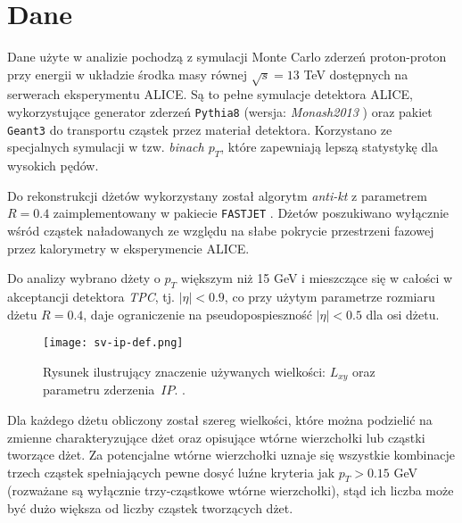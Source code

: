 \section{Dane}
\label{sec:dane}


Dane użyte w analizie pochodzą z symulacji Monte Carlo zderzeń proton-proton przy energii w układzie środka masy równej $\sqrt{s} = 13$ TeV dostępnych na serwerach eksperymentu ALICE.
Są to pełne symulacje detektora ALICE, wykorzystujące generator zderzeń \texttt{Pythia8} \cite{Sjostrand:2007gs} (wersja: \textit{Monash2013} \cite{Skands:2014pea}) oraz pakiet \texttt{Geant3} \cite{Brun:1994aa} do transportu cząstek przez materiał detektora. Korzystano ze specjalnych symulacji w tzw. \textit{binach $p_T$}, które zapewniają lepszą statystykę dla wysokich pędów.

Do rekonstrukcji dżetów wykorzystany został algorytm \textit{anti-kt} z parametrem $R = 0.4$ zaimplementowany w pakiecie \texttt{FASTJET} \cite{Cacciari:2011ma}. Dżetów poszukiwano wyłącznie wśród cząstek naładowanych  ze względu na słabe pokrycie przestrzeni fazowej przez kalorymetry w eksperymencie ALICE.

Do analizy wybrano dżety o $p_T$ większym niż 15 GeV i mieszczące się w całości w akceptancji detektora \textit{TPC}, tj. $|\eta| < 0.9$, co przy użytym parametrze rozmiaru dżetu $R = 0.4$, daje ograniczenie na pseudopospieszność $|\eta| < 0.5$ dla osi dżetu.

\begin{figure}[ht]
	\centering
	\texttt{[image: sv-ip-def.png]}
	\caption{Rysunek ilustrujący znaczenie używanych wielkości: $L_{xy}$ oraz parametru zderzenia~$IP$. .}
	\label{fig:sv-ip-def}
\end{figure}

Dla każdego dżetu obliczony został szereg wielkości, które można podzielić na zmienne charakteryzujące dżet oraz opisujące wtórne wierzchołki lub cząstki tworzące dżet. 
Za potencjalne wtórne wierzchołki uznaje się wszystkie kombinacje trzech cząstek spełniających pewne dosyć luźne kryteria jak $p_T > 0.15$ GeV (rozważane są wyłącznie trzy-cząstkowe wtórne wierzchołki), stąd ich liczba może być dużo większa od liczby cząstek tworzących dżet.


